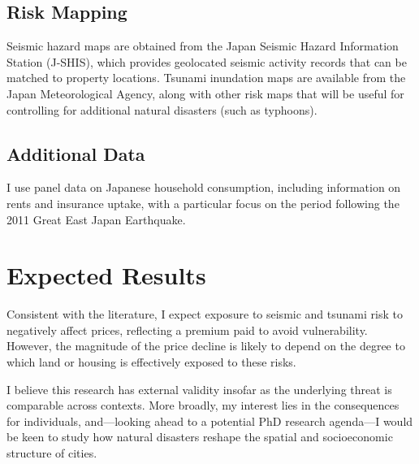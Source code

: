 \documentclass{article}
\begin{document}
\subsection{Risk Mapping}

Seismic hazard maps are obtained from the Japan Seismic Hazard Information Station (J-SHIS), which provides geolocated seismic activity records that can be matched to property locations. Tsunami inundation maps are available from the Japan Meteorological Agency, along with other risk maps that will be useful for controlling for additional natural disasters (such as typhoons).

\subsection{Additional Data}

I use panel data on Japanese household consumption, including information on rents and insurance uptake, with a particular focus on the period following the 2011 Great East Japan Earthquake.


\section{Expected Results}

Consistent with the literature, I expect exposure to seismic and tsunami risk to negatively affect prices, reflecting a premium paid to avoid vulnerability. However, the magnitude of the price decline is likely to depend on the degree to which land or housing is effectively exposed to these risks.

I believe this research has external validity insofar as the underlying threat is comparable across contexts. More broadly, my interest lies in the consequences for individuals, and—looking ahead to a potential PhD research agenda—I would be keen to study how natural disasters reshape the spatial and socioeconomic structure of cities.



\end{document}
